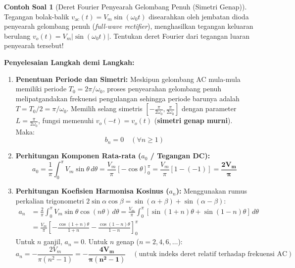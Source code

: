 \documentclass[11pt,a4paper]{article}
\theoremstyle{definition}
\newtheorem{example}{Contoh Soal}[section]
\begin{document}
\begin{example}[Deret Fourier Penyearah Gelombang Penuh (Simetri Genap)]
Tegangan bolak-balik $v_{\text{ac}}(t) = V_m \sin(\omega_0 t)$ disearahkan oleh jembatan dioda penyearah gelombang penuh (\textit{full-wave rectifier}), menghasilkan tegangan keluaran berulang $v_o(t) = V_m |\sin(\omega_0 t)|$. Tentukan deret Fourier dari tegangan luaran penyearah tersebut!
\end{example}

\noindent\textbf{Penyelesaian Langkah demi Langkah:}
\begin{enumerate}[leftmargin=*]
    \item \textbf{Penentuan Periode dan Simetri:}
    Meskipun gelombang AC mula-mula memiliki periode $T_0 = 2\pi/\omega_0$, proses penyearahan gelombang penuh melipatgandakan frekuensi pengulangan sehingga periode barunya adalah $T = T_0 / 2 = \pi/\omega_0$.
    Memilih selang simetris $[-\frac{\pi}{2\omega_0}, \frac{\pi}{2\omega_0}]$ dengan parameter $L = \frac{\pi}{2\omega_0}$, fungsi memenuhi $v_o(-t) = v_o(t)$ (\textbf{simetri genap murni}). Maka:
    \begin{equation*}
        b_n = 0 \quad (\forall n \ge 1)
    \end{equation*}
    
    \item \textbf{Perhitungan Komponen Rata-rata ($a_0$ / Tegangan DC):}
    \begin{equation*}
        a_0 = \frac{1}{\pi} \int_{0}^{\pi} V_m \sin\theta \, d\theta = \frac{V_m}{\pi} [-\cos\theta]_{0}^{\pi} = \frac{V_m}{\pi} [1 - (-1)] = \mathbf{\frac{2 V_m}{\pi}}
    \end{equation*}
    
    \item \textbf{Perhitungan Koefisien Harmonisa Kosinus ($a_n$):}
    Menggunakan rumus perkalian trigonometri $2\sin\alpha \cos\beta = \sin(\alpha + \beta) + \sin(\alpha - \beta)$:
    \begin{align*}
        a_n &= \frac{2}{\pi} \int_{0}^{\pi} V_m \sin\theta \cos(n\theta) \, d\theta = \frac{V_m}{\pi} \int_{0}^{\pi} [\sin(1 + n)\theta + \sin(1 - n)\theta] \, d\theta \\
            &= \frac{V_m}{\pi} \left[ -\frac{\cos(1 + n)\theta}{1 + n} - \frac{\cos(1 - n)\theta}{1 - n} \right]_{0}^{\pi}
    \end{align*}
    Untuk $n$ ganjil, $a_n = 0$. Untuk $n$ genap ($n = 2, 4, 6, \dots$):
    \begin{equation*}
        a_n = -\frac{2 V_m}{\pi (n^2 - 1)} = \mathbf{-\frac{4 V_m}{\pi (n^2 - 1)}} \quad (\text{untuk indeks deret relatif terhadap frekuensi AC})
    \end{equation*}
    

\end{enumerate}
\end{document}
